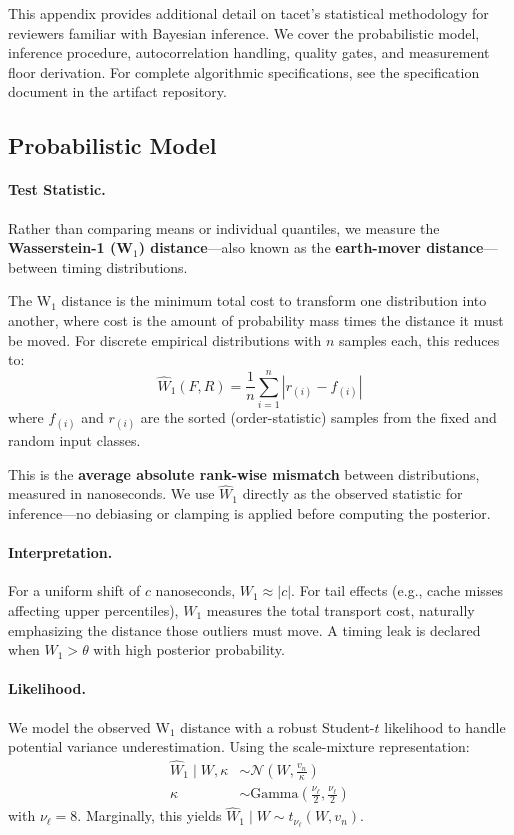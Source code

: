 \documentclass[letterpaper,twocolumn,10pt]{article}
\begin{document}
This appendix provides additional detail on tacet's statistical methodology for reviewers familiar with Bayesian inference. We cover the probabilistic model, inference procedure, autocorrelation handling, quality gates, and measurement floor derivation. For complete algorithmic specifications, see the specification document in the artifact repository.

\subsection{Probabilistic Model}
\label{app:model}

\paragraph{Test Statistic.}
Rather than comparing means or individual quantiles, we measure the \textbf{Wasserstein-1 (W$_1$)
distance}---also known as the \textbf{earth-mover distance}---between timing distributions.

The W$_1$ distance is the minimum total cost to transform one distribution into another, where
cost is the amount of probability mass times the distance it must be moved. For discrete
empirical distributions with $n$ samples each, this reduces to:
\begin{equation}
\widehat{W}_1(F, R) = \frac{1}{n}\sum_{i=1}^{n} \left| r_{(i)} - f_{(i)} \right|
\end{equation}
where $f_{(i)}$ and $r_{(i)}$ are the sorted (order-statistic) samples from the fixed and
random input classes.

This is the \textbf{average absolute rank-wise mismatch} between distributions, measured in
nanoseconds. We use $\widehat{W}_1$ directly as the observed statistic for inference---no
debiasing or clamping is applied before computing the posterior.

\paragraph{Interpretation.}
For a uniform shift of $c$ nanoseconds, $W_1 \approx |c|$. For tail effects (e.g., cache
misses affecting upper percentiles), $W_1$ measures the total transport cost, naturally
emphasizing the distance those outliers must move. A timing leak is declared when
$W_1 > \theta$ with high posterior probability.

\paragraph{Likelihood.}
We model the observed W$_1$ distance with a robust Student-$t$ likelihood to handle potential
variance underestimation. Using the scale-mixture representation:
\begin{align}
\widehat{W}_1 \mid W, \kappa &\sim \mathcal{N}\!\left(W, \frac{v_n}{\kappa}\right) \\
\kappa &\sim \text{Gamma}\!\left(\frac{\nu_\ell}{2}, \frac{\nu_\ell}{2}\right)
\end{align}
with $\nu_\ell = 8$. Marginally, this yields $\widehat{W}_1 \mid W \sim t_{\nu_\ell}(W, v_n)$.
\end{document}
